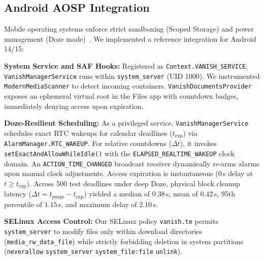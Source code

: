 \subsection{Android AOSP Integration}
Mobile operating systems enforce strict sandboxing (Scoped Storage) and power management (Doze mode)~\cite{android_scoped_storage}. We implemented a reference integration for Android 14/15:

\textbf{System Service and SAF Hooks:} Registered as \texttt{Context.VANISH\_SERVICE}, \texttt{VanishManagerService} runs within \texttt{system\_server} (UID 1000). We instrumented \texttt{ModernMediaScanner} to detect incoming containers. \texttt{VanishDocumentsProvider} exposes an ephemeral virtual root in the Files app with countdown badges, immediately denying access upon expiration.

\textbf{Doze-Resilient Scheduling:} As a privileged service, \texttt{VanishManagerService} schedules exact RTC wakeups for calendar deadlines ($t_{\text{exp}}$) via \texttt{AlarmManager.RTC\_WAKEUP}. For relative countdowns ($\Delta t$), it invokes \texttt{setExactAndAllowWhileIdle()} with the \texttt{ELAPSED\_REALTIME\_WAKEUP} clock domain. An \texttt{ACTION\_TIME\_CHANGED} broadcast receiver dynamically re-arms alarms upon manual clock adjustments. Access expiration is instantaneous ($0$\,s delay at $t \ge t_{\text{exp}}$). Across 500 test deadlines under deep Doze, physical block cleanup latency ($\Delta t = t_{\text{purge}} - t_{\text{exp}}$) yielded a median of $0.38$\,s, mean of $0.42$\,s, 95th percentile of $1.15$\,s, and maximum delay of $2.10$\,s.

\textbf{SELinux Access Control:} Our SELinux policy \texttt{vanish.te} permits \texttt{system\_server} to modify files only within download directories (\texttt{media\_rw\_data\_file}) while strictly forbidding deletion in system partitions (\texttt{neverallow} \texttt{system\_server} \texttt{system\_file:file} \texttt{unlink}).

